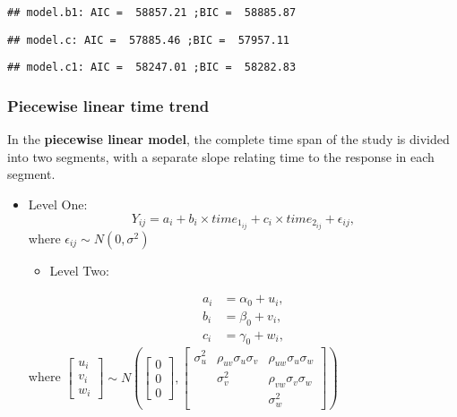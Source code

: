 \documentclass[
]{article}
\providecommand{\tightlist}{%
  \setlength{\itemsep}{0pt}\setlength{\parskip}{0pt}}
\begin{document}
\begin{verbatim}
## model.b1: AIC =  58857.21 ;BIC =  58885.87
\end{verbatim}

\begin{verbatim}
## model.c: AIC =  57885.46 ;BIC =  57957.11
\end{verbatim}

\begin{verbatim}
## model.c1: AIC =  58247.01 ;BIC =  58282.83
\end{verbatim}

\hypertarget{piecewise-linear-time-trend}{%
\subsubsection{Piecewise linear time
trend}\label{piecewise-linear-time-trend}}

In the \textbf{piecewise linear model}, the complete time span of the
study is divided into two segments, with a separate slope relating time
to the response in each segment.

\begin{itemize}
\item
  Level One:
  \[Y_{ij} = a_i + b_i \times time_{1_{ij}} + c_i \times time_{2_{ij}} + \epsilon_{ij},\]
  where \(\epsilon_{ij} \sim N(0,\sigma^2)\)

  \begin{itemize}
  \tightlist
  \item
    Level Two:
  \end{itemize}

  \begin{align}
  a_i &= \alpha_0 + u_i, \\
  b_i &= \beta_0 + v_i, \\
  c_i &= \gamma_0 + w_i,
  \end{align} where
  \(\begin{bmatrix} u_i \\ v_i \\w_i \end{bmatrix} \sim N\left(\begin{bmatrix} 0 \\ 0 \\0 \end{bmatrix}, \begin{bmatrix}\sigma_{u}^2 & \rho_{uv}\sigma_u\sigma_v & \rho_{uw} \sigma_u \sigma_w \\ & \sigma_v^2 & \rho_{vw} \sigma_v\sigma_w \\ & & \sigma_w^2 \end{bmatrix}\right)\)
\end{itemize}
\end{document}
